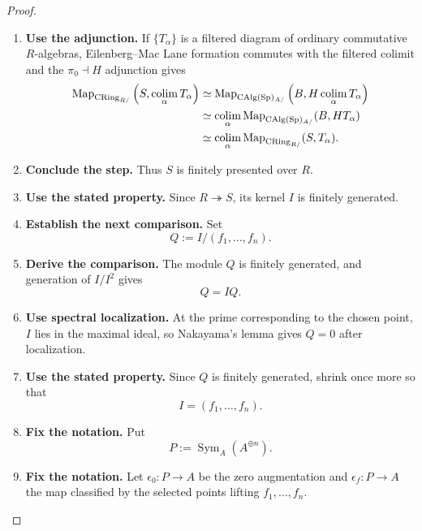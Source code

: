 \begin{proof}
\begin{enumerate}[label=\textup{(\arabic*)}]
    \item \textbf{Use the adjunction.}
    If \(\{T_\alpha\}\) is a filtered diagram of ordinary commutative \(R\)-algebras,
    Eilenberg--Mac Lane formation commutes with the filtered colimit and the \(\pi_0\dashv H\)
    adjunction gives
    \[
        \begin{aligned}
            \operatorname{Map}_{\operatorname{CRing}_{R/}}
            \left(S,\operatorname*{colim}_\alpha T_\alpha\right)
            &\simeq
            \operatorname{Map}_{\operatorname{CAlg}(\operatorname{Sp})_{A/}}
            \left(B,H\operatorname*{colim}_\alpha T_\alpha\right)
            \\
            &\simeq
            \operatorname*{colim}_\alpha
            \operatorname{Map}_{\operatorname{CAlg}(\operatorname{Sp})_{A/}}(B,HT_\alpha)
            \\
            &\simeq
            \operatorname*{colim}_\alpha
            \operatorname{Map}_{\operatorname{CRing}_{R/}}(S,T_\alpha).
        \end{aligned}
        \]

    \item \textbf{Conclude the step.}
    Thus \(S\) is finitely presented over \(R\).

    \item \textbf{Use the stated property.}
    Since \(R\twoheadrightarrow
    S\), its kernel \(I\) is finitely generated.

    \item \textbf{Establish the next comparison.}
    Set
    \[
            Q:=I/(f_1,\ldots,f_n).
        \]

    \item \textbf{Derive the comparison.}
    The module \(Q\) is finitely generated, and generation of \(I/I^2\) gives
    \[
            Q=IQ.
        \]

    \item \textbf{Use spectral localization.}
    At the prime corresponding to the chosen point, \(I\) lies in the maximal ideal, so
    Nakayama's lemma gives \(Q=0\) after localization.

    \item \textbf{Use the stated property.}
    Since \(Q\) is finitely generated, shrink once more so that
    \[
            I=(f_1,\ldots,f_n).
        \]

    \item \textbf{Fix the notation.}
    Put
    \[
            P:=\operatorname{Sym}_A(A^{\oplus n}).
        \]

    \item \textbf{Fix the notation.}
    Let \(\epsilon_0:P\to A\) be the zero augmentation and \(\epsilon_f:P\to A\) the map classified by the selected
    points lifting \(f_1,\ldots,f_n\).


\end{enumerate}
\end{proof}
